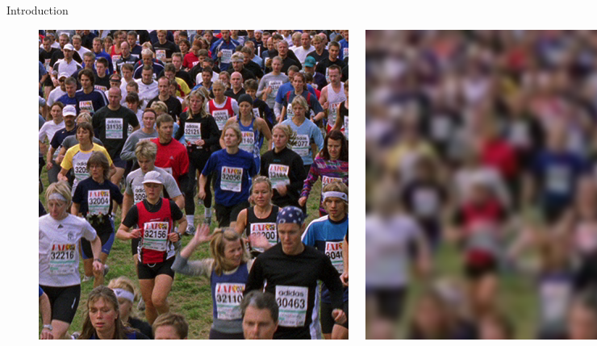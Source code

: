 \documentclass{beamer}
\begin{document}
\begin{frame}{Introduction}
\begin{figure}
  \begin{columns}
      \includegraphics[width=0.6\linewidth]{static/crowd_original.png}
      \includegraphics[width=0.6\linewidth]{static/crowd_compressed_blurred.png}
      \includegraphics[width=0.6\linewidth]{static/crowd_srunet_int8.png}

\end{columns}
\end{figure}
\end{frame}
\end{document}
